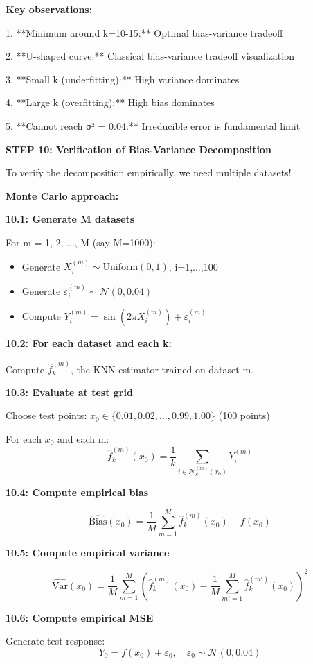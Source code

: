 \documentclass[12pt]{article}
\begin{document}
\begin{solution}
\textbf{Key observations:}

1. **Minimum around k=10-15:** Optimal bias-variance tradeoff

2. **U-shaped curve:** Classical bias-variance tradeoff visualization

3. **Small k (underfitting):** High variance dominates

4. **Large k (overfitting):** High bias dominates

5. **Cannot reach σ² = 0.04:** Irreducible error is fundamental limit

\textbf{STEP 10: Verification of Bias-Variance Decomposition}

To verify the decomposition empirically, we need multiple datasets!

\textbf{Monte Carlo approach:}

\textbf{10.1: Generate M datasets}

For m = 1, 2, ..., M (say M=1000):
\begin{itemize}
    \item Generate $X_i^{(m)} \sim \text{Uniform}(0,1)$, i=1,...,100
    \item Generate $\varepsilon_i^{(m)} \sim \mathcal{N}(0, 0.04)$
    \item Compute $Y_i^{(m)} = \sin(2\pi X_i^{(m)}) + \varepsilon_i^{(m)}$
\end{itemize}

\textbf{10.2: For each dataset and each k:}

Compute $\hat{f}_k^{(m)}$, the KNN estimator trained on dataset m.

\textbf{10.3: Evaluate at test grid}

Choose test points: $x_0 \in \{0.01, 0.02, ..., 0.99, 1.00\}$ (100 points)

For each $x_0$ and each m:
\[
\hat{f}_k^{(m)}(x_0) = \frac{1}{k}\sum_{i \in \mathcal{N}_k^{(m)}(x_0)} Y_i^{(m)}
\]

\textbf{10.4: Compute empirical bias}

\[
\widehat{\text{Bias}}(x_0) = \frac{1}{M}\sum_{m=1}^M \hat{f}_k^{(m)}(x_0) - f(x_0)
\]

\textbf{10.5: Compute empirical variance}

\[
\widehat{\text{Var}}(x_0) = \frac{1}{M}\sum_{m=1}^M \left(\hat{f}_k^{(m)}(x_0) - \frac{1}{M}\sum_{m'=1}^M \hat{f}_k^{(m')}(x_0)\right)^2
\]

\textbf{10.6: Compute empirical MSE}

Generate test response:
\[
Y_0 = f(x_0) + \varepsilon_0, \quad \varepsilon_0 \sim \mathcal{N}(0, 0.04)
\]


\end{solution}
\end{document}
